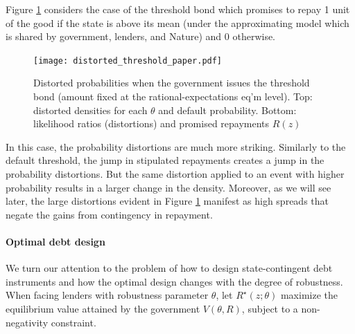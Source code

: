 Figure \ref{Figure_distorted_threshold} considers the case of the threshold bond which promises to repay 1 unit of the good if the state is above its mean (under the approximating model which is shared by government, lenders, and Nature) and 0 otherwise. 
\begin{figure}[!hbtp]\centering
  \texttt{[image: distorted\_threshold\_paper.pdf]}
\caption{Distorted probabilities when the government issues the threshold bond (amount fixed at the rational-expectations eq'm level). Top: distorted densities for each $\theta$ and default probability. Bottom: likelihood ratios (distortions) and promised repayments $R(z)$
\label{Figure_distorted_threshold}}
\end{figure}
In this case, the probability distortions are much more striking. Similarly to the default threshold, the jump in stipulated repayments creates a jump in the probability distortions. But the same distortion applied to an event with higher probability results in a larger change in the density. Moreover, as we will see later, the large distortions evident in Figure \ref{Figure_distorted_threshold} manifest as high spreads that negate the gains from contingency in repayment.

\paragraph{Optimal debt design} We turn our attention to the problem of how to design state-contingent debt instruments and how the optimal design changes with the degree of robustness. When facing lenders with robustness parameter $\theta$, let $R^\star(z;\theta)$ maximize the equilibrium value attained by the government $V(\theta, R)$, subject to a non-negativity constraint.

